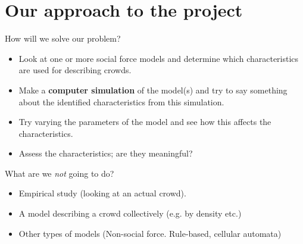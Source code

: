 \documentclass{beamer}
\begin{document}
\section{Our approach to the project}
\begin{frame}{How will we solve our problem?}
    \begin{itemize}
            \item Look at one or more social force models and determine which 
                characteristics are used for describing crowds.
            \item Make a \textbf{computer simulation} of the model(s) and try 
                to say something about the identified characteristics from 
                this simulation.
            \item Try varying the parameters of the model and see how this 
                affects the characteristics.
            \item Assess the characteristics; are they meaningful?
    \end{itemize}
\end{frame}

\begin{frame}{What are we \emph{not} going to do?}
    \begin{itemize}
        \item Empirical study (looking at an actual crowd).
        \item A model describing a crowd collectively (e.g. by density etc.)
        \item Other types of models (Non-social force. Rule-based, cellular 
            automata)
    \end{itemize}
\end{frame}
\end{document}
